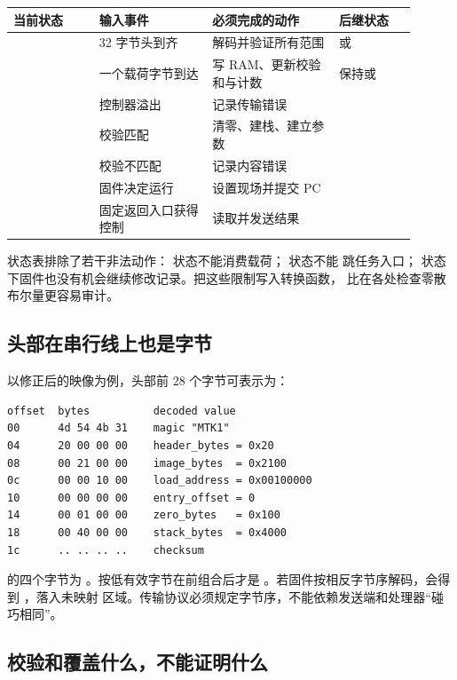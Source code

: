 \begin{longtable}{|L{0.19\linewidth}|L{0.25\linewidth}|L{0.29\linewidth}|L{0.17\linewidth}|}
\hline
{}
当前状态 & 输入事件 & 必须完成的动作 & 后继状态 \\ \hline
{} & 32 字节头到齐 & 解码并验证所有范围 &  或
 \\ \hline
{} & 一个载荷字节到达 & 写 RAM、更新校验和与计数 & 保持或
 \\ \hline
{} & 控制器溢出 & 记录传输错误 &  \\ \hline
{} & 校验匹配 & 清零、建栈、建立参数 &  \\ \hline
{} & 校验不匹配 & 记录内容错误 &  \\ \hline
{} & 固件决定运行 & 设置现场并提交 PC &  \\ \hline
{} & 固定返回入口获得控制 & 读取并发送结果 &  \\ \hline
\end{longtable}

状态表排除了若干非法动作： 状态不能消费载荷； 状态不能
跳任务入口； 状态下固件也没有机会继续修改记录。把这些限制写入转换函数，
比在各处检查零散布尔量更容易审计。

\subsection{头部在串行线上也是字节}

以修正后的映像为例，头部前 28 个字节可表示为：

\begin{lstlisting}
offset  bytes          decoded value
00      4d 54 4b 31    magic "MTK1"
04      20 00 00 00    header_bytes = 0x20
08      00 21 00 00    image_bytes  = 0x2100
0c      00 00 10 00    load_address = 0x00100000
10      00 00 00 00    entry_offset = 0
14      00 01 00 00    zero_bytes   = 0x100
18      00 40 00 00    stack_bytes  = 0x4000
1c      .. .. .. ..    checksum
\end{lstlisting}

 的四个字节为 。按低有效字节在前组合后才是
。若固件按相反字节序解码，会得到 ，落入未映射
区域。传输协议必须规定字节序，不能依赖发送端和处理器“碰巧相同”。

\subsection{校验和覆盖什么，不能证明什么}

